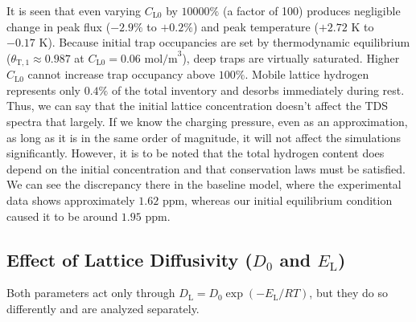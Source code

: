 \documentclass[a4paper,12pt,oneside]{report}
\begin{document}
It is seen that even varying $C_{\mathrm{L0}}$ by $10000\%$ (a factor of 100) produces negligible change in peak flux ($-2.9\%$ to $+0.2\%$) and peak temperature ($+2.72\text{ K}$ to $-0.17\text{ K}$). Because initial trap occupancies are set by thermodynamic equilibrium ($\theta_{\mathrm{T,1}} \approx 0.987$ at $C_{\mathrm{L0}} = 0.06\text{ mol/m}^3$), deep traps are virtually saturated. Higher $C_{\mathrm{L0}}$ cannot increase trap occupancy above $100\%$. Mobile lattice hydrogen represents only $0.4\%$ of the total inventory and desorbs immediately during rest. Thus, we can say that the initial lattice concentration doesn't affect the TDS spectra that largely. If we know the charging pressure, even as an approximation, as long as it is in the same order of magnitude, it will not affect the simulations significantly. However, it is to be noted that the total hydrogen content does depend on the initial concentration and that conservation laws must be satisfied. We can see the discrepancy there in the baseline model, where the experimental data shows approximately $1.62\text{ ppm}$, whereas our initial equilibrium condition caused it to be around $1.95\text{ ppm}$.

\subsection{Effect of Lattice Diffusivity ($D_0$ and $E_{\mathrm{L}}$)}

Both parameters act only through $D_{\mathrm{L}} = D_0 \exp(-E_{\mathrm{L}}/RT)$, but they do so differently and are analyzed separately.
\end{document}
